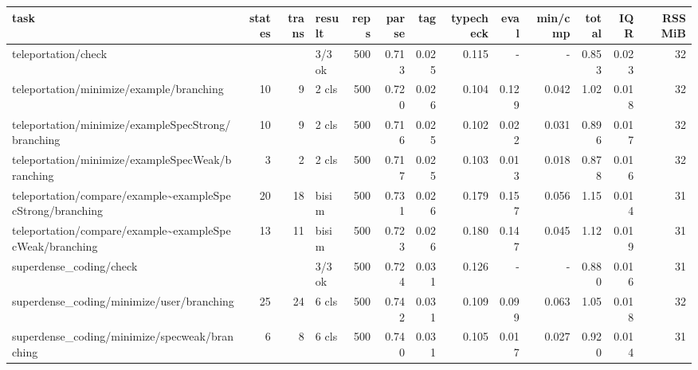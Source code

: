 \begin{tabular}{lrrlrrrrrrrrr}
	\toprule
	task                                                                                & states & trans   & result    & reps & parse & tag   & typecheck & eval    & min/cmp & total   & IQR   & RSS MiB \\
	\midrule
	teleportation/check                                                                 &        &         & 3/3 ok    & 500  & 0.713 & 0.025 & 0.115     & -       & -       & 0.853   & 0.023 & 32      \\
	teleportation/minimize/example/branching                                            & 10     & 9       & 2 cls     & 500  & 0.720 & 0.026 & 0.104     & 0.129   & 0.042   & 1.02    & 0.018 & 32      \\
	teleportation/minimize/exampleSpecStrong/branching                                  & 10     & 9       & 2 cls     & 500  & 0.716 & 0.025 & 0.102     & 0.022   & 0.031   & 0.896   & 0.017 & 32      \\
	teleportation/minimize/exampleSpecWeak/branching                                    & 3      & 2       & 2 cls     & 500  & 0.717 & 0.025 & 0.103     & 0.013   & 0.018   & 0.878   & 0.016 & 32      \\
	teleportation/compare/example\textasciitilde{}exampleSpecStrong/branching           & 20     & 18      & bisim     & 500  & 0.731 & 0.026 & 0.179     & 0.157   & 0.056   & 1.15    & 0.014 & 31      \\
	teleportation/compare/example\textasciitilde{}exampleSpecWeak/branching             & 13     & 11      & bisim     & 500  & 0.723 & 0.026 & 0.180     & 0.147   & 0.045   & 1.12    & 0.019 & 31      \\
	superdense\_coding/check                                                            &        &         & 3/3 ok    & 500  & 0.724 & 0.031 & 0.126     & -       & -       & 0.880   & 0.016 & 31      \\
	superdense\_coding/minimize/user/branching                                          & 25     & 24      & 6 cls     & 500  & 0.742 & 0.031 & 0.109     & 0.099   & 0.063   & 1.05    & 0.018 & 32      \\
	superdense\_coding/minimize/specweak/branching                                      & 6      & 8       & 6 cls     & 500  & 0.740 & 0.031 & 0.105     & 0.017   & 0.027   & 0.920   & 0.014 & 31      \\

\end{tabular}
